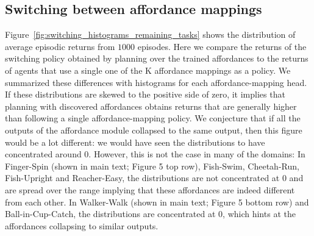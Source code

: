 \documentclass[nohyperref]{article}
\theoremstyle{plain}
\theoremstyle{definition}
\theoremstyle{remark}
\begin{document}
\subsection{Switching between affordance mappings}
Figure~\ref{fig:switching_histograms_remaining_tasks} shows the distribution of average episodic returns from $1000$ episodes. Here we compare the returns of the switching policy obtained by planning over the trained affordances to the returns of agents that use a single one of the K affordance mappings as a policy. We summarized these differences with histograms for each affordance-mapping head. If these distributions are skewed to the positive side of zero, it implies that planning with discovered affordances obtains returns that are generally higher than following a single affordance-mapping policy. We conjecture that if all the outputs of the affordance module collapsed to the same output, then this figure would be a lot different:  we would have seen the distributions to have concentrated around 0. However, this is not the case in many of the domains: In Finger-Spin (shown in main text; Figure 5 top row), Fish-Swim, Cheetah-Run, Fish-Upright and Reacher-Easy, the distributions are not concentrated at 0 and are spread over the range implying that these affordances are indeed different from each other. In Walker-Walk (shown in main text; Figure 5 bottom row) and Ball-in-Cup-Catch, the distributions are concentrated at 0, which hints at the affordances collapsing to similar outputs. 
\end{document}
